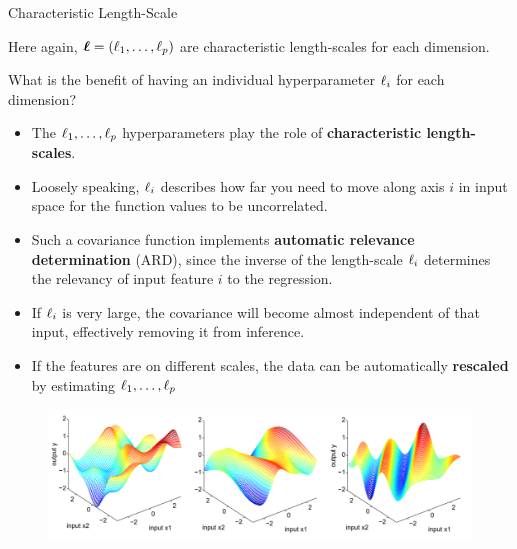 \begin{frame}[c,allowframebreaks]{Characteristic Length-Scale}
\lz 
\lz

Here again, $\bm{\ell} = (\ell_1,\dots, \ell_p)$ are characteristic length-scales for each dimension. 


\framebreak

What is the benefit of having an individual hyperparameter $\ell_i$ for each dimension?

\vspace{4mm}

\begin{itemize} 
\item The $\ell_1,\dots, \ell_p$ hyperparameters play the role of \textbf{characteristic length-scales}.
\vspace{2mm}
\item Loosely speaking, $\ell_i$ describes how far you need to move along axis $i$ in input space for the function values to be uncorrelated.
\vspace{2mm}
\item Such a covariance function implements \textbf{automatic relevance determination} (ARD), since the inverse of the length-scale $\ell_i$ determines the relevancy of input feature $i$ to the regression.
\vspace{2mm}
\item If $\ell_i$ is very large, the covariance will become almost independent of that input, effectively removing it from inference.
\vspace{2mm}
\item If the features are on different scales, the data can be automatically \textbf{rescaled} by estimating $\ell_1,\dots, \ell_p$ 

\end{itemize}



\framebreak


\begin{figure}
	\includegraphics[width = .8\textwidth]{figure_man/covariance2D.png}
\end{figure}


\end{frame}
